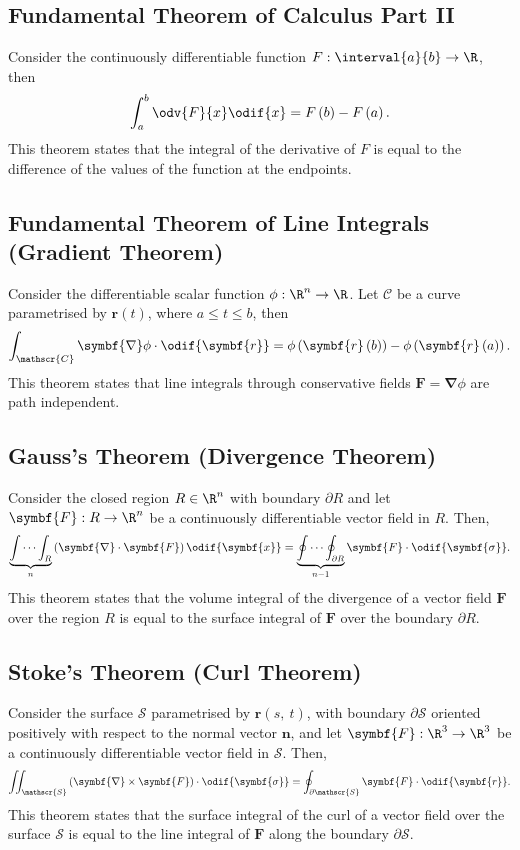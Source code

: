 \documentclass{article}
\begin{document}
\subsection{Fundamental Theorem of Calculus Part II}
Consider the continuously differentiable function
\(F:\interval{a}{b} \to \R\), then
\begin{equation*}
    \int_a^b \odv{F}{x} \odif{x} = F\left( b \right) - F\left( a \right).
\end{equation*}
This theorem states that the integral of the derivative of \(F\) is
equal to the difference of the values of the function at the endpoints.
\subsection{Fundamental Theorem of Line Integrals (Gradient Theorem)}
Consider the differentiable scalar function \(\phi:\R^n \to \R\). Let
\(\mathscr{C}\) be a curve parametrised by \(\symbf{r}\left( t \right)\),
where \(a \leq t \leq b\), then
\begin{equation*}
    \int_{\mathscr{C}} \symbf{\nabla} \phi \cdot \odif{\symbf{r}} = \phi\left( \symbf{r}\left( b \right) \right) - \phi\left( \symbf{r}\left( a \right) \right).
\end{equation*}
This theorem states that line integrals through conservative fields
\(\symbf{F} = \symbf{\nabla} \phi\) are path independent.
\subsection{Gauss's Theorem (Divergence Theorem)}
Consider the closed region \(R \in \R^n\) with boundary \(\partial R\)
and let \(\symbf{F}:R \to \R^n\) be a continuously differentiable vector
field in \(R\). Then,
\begin{equation*}
    \underbrace{\int \cdots \int_R}_n \left( \symbf{\nabla} \cdot \symbf{F} \right) \odif{\symbf{x}} = \underbrace{\oint \cdots \oint_{\partial R}}_{n-1} \symbf{F} \cdot \odif{\symbf{\sigma}}.
\end{equation*}
This theorem states that the volume integral of the divergence of a
vector field \(\symbf{F}\) over the region \(R\) is equal to the surface
integral of \(\symbf{F}\) over the boundary \(\partial R\).
\subsection{Stoke's Theorem (Curl Theorem)}
Consider the surface \(\mathscr{S}\) parametrised by \(\symbf{r}\left( s,\: t \right)\),
with boundary \(\partial \mathscr{S}\) oriented positively with respect
to the normal vector \(\symbf{n}\), and let \(\symbf{F}:\R^3 \to \R^3\)
be a continuously differentiable vector field in \(\mathscr{S}\). Then,
\begin{equation*}
    \iint_{\mathscr{S}} \left( \symbf{\nabla} \times \symbf{F} \right) \cdot \odif{\symbf{\sigma}} = \oint_{\partial \mathscr{S}} \symbf{F} \cdot \odif{\symbf{r}}.
\end{equation*}
This theorem states that the surface integral of the curl of a vector
field over the surface \(\mathscr{S}\) is equal to the line integral of
\(\symbf{F}\) along the boundary \(\partial \mathscr{S}\).
\end{document}

